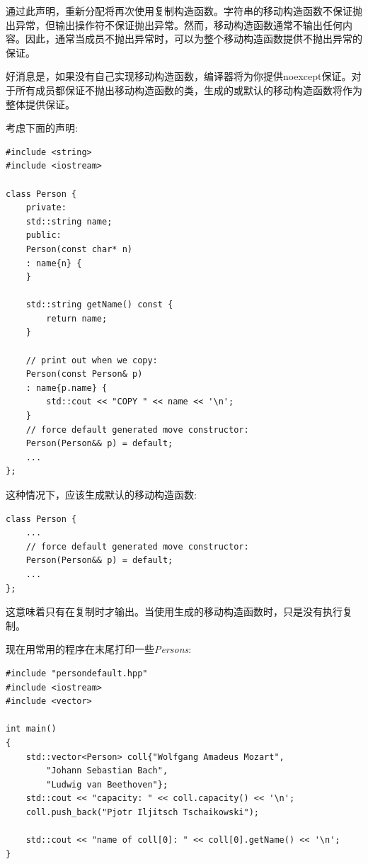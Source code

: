 通过此声明，重新分配将再次使用复制构造函数。字符串的移动构造函数不保证抛出异常，但输出操作符不保证抛出异常。然而，移动构造函数通常不输出任何内容。因此，通常当成员不抛出异常时，可以为整个移动构造函数提供不抛出异常的保证。\par

好消息是，如果没有自己实现移动构造函数，编译器将为你提供noexcept保证。对于所有成员都保证不抛出移动构造函数的类，生成的或默认的移动构造函数将作为整体提供保证。\par

考虑下面的声明:\par

{\color{red}{basics/persondefault.hpp}}\par

\begin{lstlisting}[caption={}]
#include <string>
#include <iostream>

class Person {
	private:
	std::string name;
	public:
	Person(const char* n)
	: name{n} {
	}

	std::string getName() const {
		return name;
	}

	// print out when we copy:
	Person(const Person& p)
	: name{p.name} {
		std::cout << "COPY " << name << '\n';
	}
	// force default generated move constructor:
	Person(Person&& p) = default;
	...
};
\end{lstlisting}

这种情况下，应该生成默认的移动构造函数:\par

\begin{lstlisting}[caption={}]
class Person {
	...
	// force default generated move constructor:
	Person(Person&& p) = default;
	...
};
\end{lstlisting}

这意味着只有在复制时才输出。当使用生成的移动构造函数时，只是没有执行复制。\par

现在用常用的程序在末尾打印一些\textit{Persons}:\par

{\color{red}{basics/persondefault.cpp}}\par

\begin{lstlisting}[caption={}]
#include "persondefault.hpp"
#include <iostream>
#include <vector>

int main()
{
	std::vector<Person> coll{"Wolfgang Amadeus Mozart",
		"Johann Sebastian Bach",
		"Ludwig van Beethoven"};
	std::cout << "capacity: " << coll.capacity() << '\n';
	coll.push_back("Pjotr Iljitsch Tschaikowski");
	
	std::cout << "name of coll[0]: " << coll[0].getName() << '\n';
}
\end{lstlisting}

